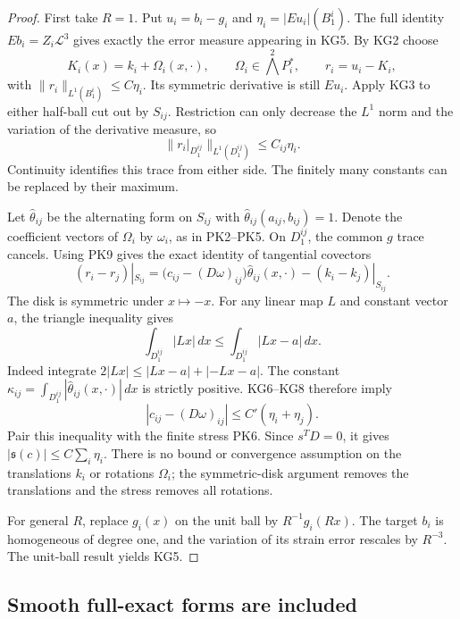 \begin{proof}
First take \(R=1\).  Put
\(u_i=b_i-g_i\) and
\(\eta_i=|Eu_i|(B_1^i)\).  The full identity
\(Eb_i=Z_i\mathcal L^3\) gives exactly the error measure
appearing in KG5.  By KG2 choose
\[
 K_i(x)=k_i+\Omega_i(x,\cdot),\qquad
              \Omega_i\in\bigwedge^2P_i^*,
 \qquad r_i=u_i-K_i,
\]
with \(\|r_i\|_{L^1(B_1^i)}\leq C\eta_i\).
Its symmetric derivative is still \(Eu_i\).
Apply KG3 to either half-ball cut out by \(S_{ij}\).
Restriction can only decrease the \(L^1\) norm and the
variation of the derivative measure, so
\[
       \|r_i|_{D_1^{ij}}\|_{L^1(D_1^{ij})}
                           \leq C_{ij}\eta_i.
 \tag{KG6}
\]
Continuity identifies this trace from either side.  The
finitely many constants can be replaced by their maximum.

Let \(\widehat\theta_{ij}\) be the alternating form on
\(S_{ij}\) with
\(\widehat\theta_{ij}(a_{ij},b_{ij})=1\).  Denote the
coefficient vectors of \(\Omega_i\) by \(\omega_i\), as in
PK2--PK5.  On \(D_1^{ij}\), the common \(g\) trace cancels.
Using PK9 gives the exact identity of tangential covectors
\[
 (r_i-r_j)|_{S_{ij}}
 =\bigl(c_{ij}-(D\omega)_{ij}\bigr)
                 \widehat\theta_{ij}(x,\cdot)
                    -(k_i-k_j)|_{S_{ij}}.
 \tag{KG7}
\]
The disk is symmetric under \(x\mapsto-x\).  For any
linear map \(L\) and constant vector \(a\), the triangle
inequality gives
\[
       \int_{D_1^{ij}}|Lx|\,dx
                     \leq\int_{D_1^{ij}}|Lx-a|\,dx.
 \tag{KG8}
\]
Indeed integrate
\(2|Lx|\leq|Lx-a|+|-Lx-a|\).
The constant
\(\kappa_{ij}=\int_{D_1^{ij}}
                  |\widehat\theta_{ij}(x,\cdot)|\,dx\)
is strictly positive.  KG6--KG8 therefore imply
\[
       |c_{ij}-(D\omega)_{ij}|
                          \leq C'(\eta_i+\eta_j).
 \tag{KG9}
\]
Pair this inequality with the finite stress PK6.  Since
\(s^TD=0\), it gives
\( |\mathfrak s(c)|\leq C\sum_i\eta_i\).
There is no bound or convergence assumption on the translations
\(k_i\) or rotations \(\Omega_i\); the symmetric-disk
argument removes the translations and the stress removes
all rotations.

For general \(R\), replace \(g_i(x)\) on the unit ball by
\(R^{-1}g_i(Rx)\).  The target \(b_i\) is homogeneous of
degree one, and the variation of its strain error rescales
by \(R^{-3}\).  The unit-ball result yields KG5.
\end{proof}

\subsection{Smooth full-exact forms are included}

